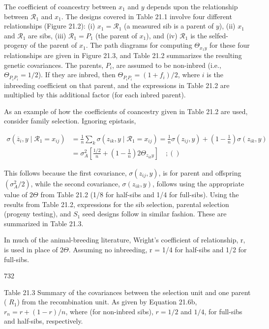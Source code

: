 \documentclass{article}
\begin{document}
The coefficient of coancestry between  $ x_1 $ and  $ y $ depends upon the relationship between  $ \mathcal{R}_1 $ and  $ x_1 $. The designs covered in Table 21.1 involve four different relationships (Figure 21.2): (i)  $ x_1 = \mathcal{R}_1 $ (a measured sib is a parent of  $ y $), (ii)  $ x_1 $ and  $ \mathcal{R}_1 $ are sibs, (iii)  $ \mathcal{R}_1 = P_1 $ (the parent of  $ x_1 $), and (iv)  $ \mathcal{R}_1 $ is the selfed-progeny of the parent of  $ x_1 $. The path diagrams for computing  $ \Theta_{x_1y} $ for these four relationships are given in Figure 21.3, and Table 21.2 summarizes the resulting genetic covariances. The parents,  $ P_i $, are assumed to be non-inbred (i.e.,  $ \Theta_{P_i P_i} = 1/2 $). If they are inbred, then  $ \Theta_{P_i P_i} = (1 + f_i)/2 $, where  $ i $ is the inbreeding coefficient on that parent, and the expressions in Table 21.2 are multiplied by this additional factor (for each inbred parent).

As an example of how the coefficients of coancestry given in Table 21.2 are used, consider family selection. Ignoring epistasis,

\begin{equation}
\begin{align*}\sigma(\overline{z}_{i},y\mid\mathcal{R}_{1}=x_{ij})&=\frac{1}{n}\sum_{k}\sigma(z_{ik},y\mid\mathcal{R}_{1}=x_{ij})=\frac{1}{n}\sigma(z_{ij},y)+\left(1-\frac{1}{n}\right)\sigma(z_{ik},y)\\&=\sigma_{A}^{2}\left[\frac{1/2}{n}+\left(1-\frac{1}{n}\right)2\Theta_{z_{ik}y}\right]\quad;()\end{align*}
\tag{21.6a}
\label{eq:21_6a}
\end{equation}

This follows because the first covariance,  $ \sigma(z_{ij}, y) $, is for parent and offspring  $ (\sigma_A^2/2) $, while the second covariance,  $ \sigma(z_{ik}, y) $, follows using the appropriate value of  $ 2\Theta $ from Table 21.2 (1/8 for half-sibs and 1/4 for full-sibs). Using the results from Table 21.2, expressions for the sib selection, parental selection (progeny testing), and  $ S_1 $ seed designs follow in similar fashion. These are summarized in Table 21.3.

In much of the animal-breeding literature, Wright's coefficient of relationship, r, is used in place of  $ 2\Theta $. Assuming no inbreeding, r = 1/4 for half-sibs and 1/2 for full-sibs.

732

Table 21.3 Summary of the covariances between the selection unit and one parent ( $ R_{1} $) from the recombination unit. As given by Equation 21.6b,  $ r_{n} = r + (1 - r)/n $, where (for non-inbred sibs),  $ r = 1/2 $ and  $ 1/4 $, for full-sibs and half-sibs, respectively.
\end{document}
